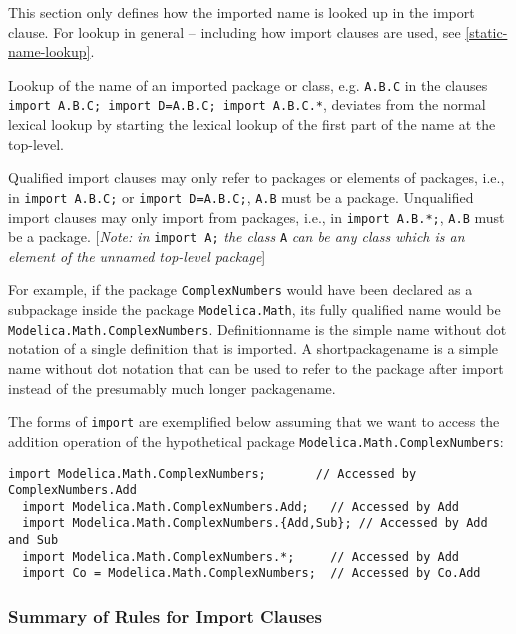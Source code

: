 This section only defines how the imported name is looked up in the
import clause. For lookup in general -- including how import clauses are
used, see \autoref{static-name-lookup}.

Lookup of the name of an imported package or class, e.g. \lstinline!A.B.C! in the
clauses \lstinline!import A.B.C; import D=A.B.C; import A.B.C.*!, deviates from the
normal lexical lookup by starting the lexical lookup of the first part
of the name at the top-level.

Qualified import clauses may only refer to packages or elements of
packages, i.e., in \lstinline!import A.B.C;! or \lstinline!import D=A.B.C;!,
\lstinline!A.B! must be a
package. Unqualified import clauses may only import from packages, i.e.,
in \lstinline!import A.B.*;!, \lstinline!A.B! must be a package. {[}\emph{Note: in} \lstinline!import A;!
\emph{the class} \lstinline!A! \emph{can be any class which is an element of the
unnamed top-level package}{]}

\begin{nonnormative}
For example, if the package \lstinline!ComplexNumbers! would have
been declared as a subpackage inside the package \lstinline!Modelica.Math!,
its fully qualified name would be \lstinline!Modelica.Math.ComplexNumbers!.
Definitionname is the simple name without dot notation of a single
definition that is imported. A shortpackagename is a simple name without
dot notation that can be used to refer to the package after import
instead of the presumably much longer packagename.

The forms of \lstinline!import! are exemplified below assuming that we want to
access the addition operation of the hypothetical package \lstinline!Modelica.Math.ComplexNumbers!:
\begin{lstlisting}[language=modelica]
  import Modelica.Math.ComplexNumbers;       // Accessed by ComplexNumbers.Add
  import Modelica.Math.ComplexNumbers.Add;   // Accessed by Add
  import Modelica.Math.ComplexNumbers.{Add,Sub}; // Accessed by Add and Sub
  import Modelica.Math.ComplexNumbers.*;     // Accessed by Add
  import Co = Modelica.Math.ComplexNumbers;  // Accessed by Co.Add
\end{lstlisting}
\end{nonnormative}

\subsubsection{Summary of Rules for Import Clauses}


